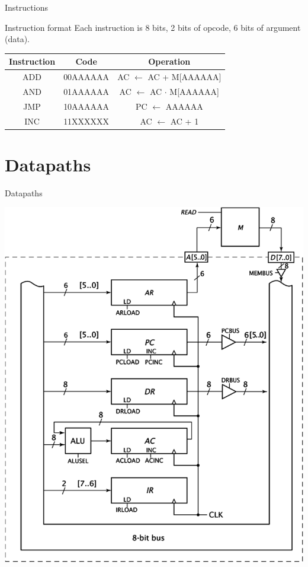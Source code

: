\begin{frame}{Instructions}
  \begin{block}{Instruction format}
    Each instruction is 8 bits, 2 bits of opcode, 6 bits of argument (data).
  \end{block}
  \begin{tabular}{ccc}
    \textbf{Instruction} & \textbf{Code} & \textbf{Operation} \\
    \hline
    ADD & 00AAAAAA & AC $\leftarrow$ AC + M[AAAAAA] \\
    AND & 01AAAAAA & AC $\leftarrow$ AC $\cdot$ M[AAAAAA] \\
    JMP & 10AAAAAA & PC $\leftarrow$ AAAAAA \\
    INC & 11XXXXXX & AC $\leftarrow$ AC + 1
  \end{tabular}
\end{frame}

\section{Datapaths}

\begin{frame}{Datapaths}
  \begin{center}
    \includegraphics[scale=0.4]{DataPaths}
  \end{center}
\end{frame}

